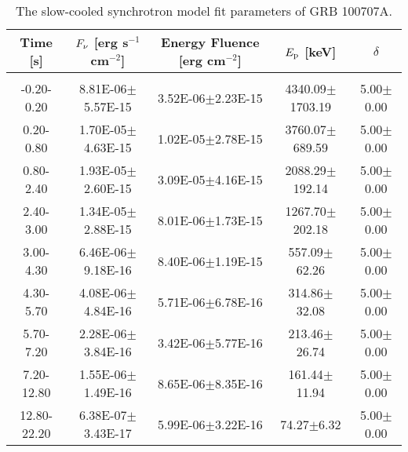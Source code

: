 \begin{table}[h]
\centering
\scriptsize
\label{tab:}
\begin{tabular}{c| c c c c}
Time [s] & $F_{\nu}$ [erg s$^{-1}$ cm$^{-2}$] & Energy Fluence [erg cm$^{-2}$] & $E_{\rm p}$ [keV] & $\delta$ \\
\hline \hline\\ 

-0.20-0.20 & 8.81E-06$\pm$5.57E-15 & 3.52E-06$\pm$2.23E-15 & 4340.09$\pm$1703.19 & 5.00$\pm$0.00 \\ 

0.20-0.80 & 1.70E-05$\pm$4.63E-15 & 1.02E-05$\pm$2.78E-15 & 3760.07$\pm$689.59 & 5.00$\pm$0.00 \\ 

0.80-2.40 & 1.93E-05$\pm$2.60E-15 & 3.09E-05$\pm$4.16E-15 & 2088.29$\pm$192.14 & 5.00$\pm$0.00 \\ 

2.40-3.00 & 1.34E-05$\pm$2.88E-15 & 8.01E-06$\pm$1.73E-15 & 1267.70$\pm$202.18 & 5.00$\pm$0.00 \\ 

3.00-4.30 & 6.46E-06$\pm$9.18E-16 & 8.40E-06$\pm$1.19E-15 & 557.09$\pm$62.26 & 5.00$\pm$0.00 \\ 

4.30-5.70 & 4.08E-06$\pm$4.84E-16 & 5.71E-06$\pm$6.78E-16 & 314.86$\pm$32.08 & 5.00$\pm$0.00 \\ 

5.70-7.20 & 2.28E-06$\pm$3.84E-16 & 3.42E-06$\pm$5.77E-16 & 213.46$\pm$26.74 & 5.00$\pm$0.00 \\ 

7.20-12.80 & 1.55E-06$\pm$1.49E-16 & 8.65E-06$\pm$8.35E-16 & 161.44$\pm$11.94 & 5.00$\pm$0.00 \\ 

12.80-22.20 & 6.38E-07$\pm$3.43E-17 & 5.99E-06$\pm$3.22E-16 & 74.27$\pm$6.32 & 5.00$\pm$0.00 \\ 

\end{tabular}
\caption{The slow-cooled synchrotron model fit parameters of GRB 100707A.}
\end{table}

